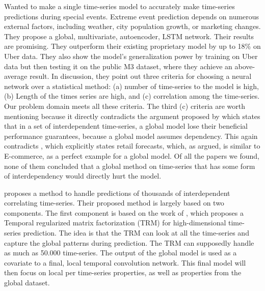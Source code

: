 \cite{Laptev}
Wanted to make a single time-series model to
accurately make time-series predictions during special events.
Extreme event prediction depends on numerous external factors, including weather, city population growth, or marketing
changes.
They propose a global, multivariate, autoencoder, LSTM network.
Their results are promising. They outperform their existing
proprietary model by up to 18\% on Uber data.
They also show the model's generalization power by training on Uber data
but then testing it on the public M3 dataset, where they achieve an above-average result.
In \cite{Laptev} discussion, they point out three criteria for
choosing a neural network over a statistical method:
(a) number of time-series to the model is high, (b) Length of the
times series are high, and (c) correlation among the time-series.
Our problem domain meets all these criteria.
The third (c) criteria are worth mentioning because it directly
contradicts the argument proposed by \cite{Montero-Manso2021}%
which states that in a set of interdependent time-series,
a global model lose their beneficial performance guarantees,
because a global model assumes dependency.
This again contradicts \cite{Hewamalage2021}, which explicitly states
retail forecasts, which, as argued, is similar to E-commerce,
as a perfect example for a global model.
Of all the papers we found, none of them concluded that a global method
on time-series that has some form of interdependency would directly hurt the model.



\cite{Sen2019} proposes a method to handle predictions of thousands of interdependent correlating time-series.
Their proposed method is largely based on two components. The first component is based on the work of
\cite{Yu}, which proposes a Temporal regularized matrix factorization (TRM) for high-dimensional time-series prediction.
The idea is that the TRM can look at all the time-series and capture the global patterns during prediction.
The TRM can supposedly handle as much as 50.000 time-series.
The output of the global model is used as a covariate to a final, local temporal convolution network. This final model
will then focus on local per time-series properties, as well as properties from the global dataset.



